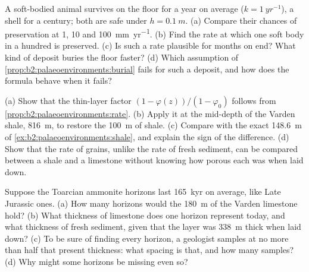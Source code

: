 \begin{exercise}[$\star\star\star$]\label{exo:b2:palaeoenvironments:10}
A soft-bodied animal survives on the floor for a year on average ($k = \qty{1}{yr^{-1}}$), a
shell for a century; both are safe under $h = \qty{0.1}{m}$. (a) Compare their chances of
preservation at 1, 10 and \qty{100}{mm.yr^{-1}}. (b) Find the rate at which one soft body in a
hundred is preserved. (c) Is such a rate plausible for months on end? What kind of deposit buries
the floor faster? (d) Which assumption of \cref{prop:b2:palaeoenvironments:burial} fails for such
a deposit, and how does the formula behave when it fails?
\end{exercise}

\begin{exercise}[$\star\star\star$]\label{exo:b2:palaeoenvironments:11}
(a) Show that the thin-layer factor $(1 - \varphi(z))/(1 - \varphi_0)$ follows from
\cref{prop:b2:palaeoenvironments:rate}. (b) Apply it at the mid-depth of the Varden shale,
\qty{816}{m}, to restore the \qty{100}{m} of shale. (c) Compare with the exact \qty{148.6}{m} of
\cref{ex:b2:palaeoenvironments:shale}, and explain the sign of the difference. (d) Show that the
rate of grains, unlike the rate of fresh sediment, can be compared between a shale and a limestone
without knowing how porous each was when laid down.
\end{exercise}

\begin{exercise}[$\star\star\star$]\label{exo:b2:palaeoenvironments:12}
Suppose the Toarcian ammonite horizons last \qty{165}{kyr} on average, like Late Jurassic ones.
(a) How many horizons would the \qty{180}{m} of the Varden limestone hold? (b) What thickness of
limestone does one horizon represent today, and what thickness of fresh sediment, given that the
layer was \qty{338}{m} thick when laid down? (c) To be sure of finding every horizon, a
geologist samples at no more than half that present thickness: what spacing is that, and how many
samples? (d) Why might some horizons be missing even so?
\end{exercise}

